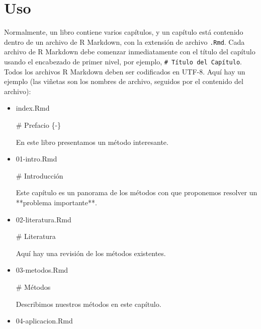 \documentclass[12pt,]{krantz}
\makeatletter
\newenvironment{Shaded}{\begin{snugshade}}{\end{snugshade}}
\newcommand{\FunctionTok}[1]{\textcolor[rgb]{0.00,0.00,0.00}{{#1}}}
\newcommand{\NormalTok}[1]{{#1}}
\newenvironment{kframe}{%
\medskip{}
\setlength{\fboxsep}{.8em}
 \def\at@end@of@kframe{}%
 \ifinner\ifhmode%
  \def\at@end@of@kframe{\end{minipage}}%
  \begin{minipage}{\columnwidth}%
 \fi\fi%
 \def\FrameCommand##1{\hskip\@totalleftmargin \hskip-\fboxsep
 \colorbox{shadecolor}{##1}\hskip-\fboxsep
     \hskip-\linewidth \hskip-\@totalleftmargin \hskip\columnwidth}%
 \MakeFramed {\advance\hsize-\width
   \@totalleftmargin\z@ \linewidth\hsize
   \@setminipage}}%
 {\par\unskip\endMakeFramed%
 \at@end@of@kframe}
\renewenvironment{Shaded}{\begin{kframe}}{\end{kframe}}
\theoremstyle{definition}
\theoremstyle{definition}
\theoremstyle{remark}
\makeatother
\begin{document}
\section{Uso}\label{uso}

Normalmente, un libro contiene varios capítulos, y un capítulo está
contenido dentro de un archivo de R Markdown, con la extensión de
archivo \texttt{.Rmd}. Cada archivo de R Markdown debe comenzar
inmediatamente con el título del capítulo usando el encabezado de primer
nivel, por ejemplo, \texttt{\#\ Título\ del\ Capítulo}. Todos los
archivos R Markdown deben ser codificados en UTF-8. Aquí hay un ejemplo
(las viñetas son los nombres de archivo, seguidos por el contenido del
archivo):

\begin{itemize}
\item
  index.Rmd

\begin{Shaded}
\begin{Highlighting}[]
\FunctionTok{# Prefacio \{-\}}

\NormalTok{En este libro presentamos un método interesante.}
\end{Highlighting}
\end{Shaded}
\item
  01-intro.Rmd

\begin{Shaded}
\begin{Highlighting}[]
\FunctionTok{# Introducción}

\NormalTok{Este capítulo es un panorama de los métodos con que proponemos resolver un  **problema importante**.}
\end{Highlighting}
\end{Shaded}
\item
  02-literatura.Rmd

\begin{Shaded}
\begin{Highlighting}[]
\FunctionTok{# Literatura}

\NormalTok{Aquí hay una revisión de los métodos existentes.}
\end{Highlighting}
\end{Shaded}
\item
  03-metodos.Rmd

\begin{Shaded}
\begin{Highlighting}[]
\FunctionTok{# Métodos}

\NormalTok{Describimos nuestros métodos en este capítulo.}
\end{Highlighting}
\end{Shaded}
\item
  04-aplicacion.Rmd


\end{itemize}
\end{document}
